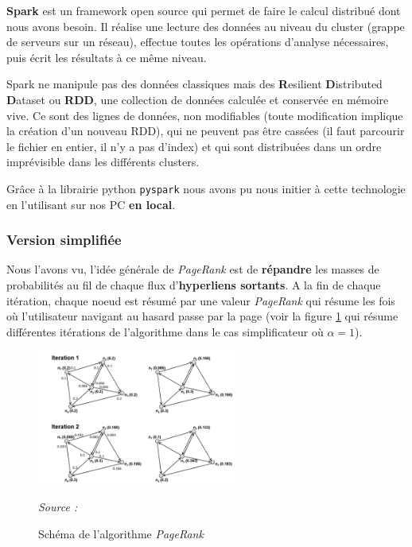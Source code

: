 \documentclass[10pt,a4paper]{article}
\theoremstyle{break}
\begin{document}
\textbf{Spark} est un framework open source qui permet de faire le calcul distribué dont nous avons besoin. Il réalise une lecture des données au niveau du cluster (grappe de serveurs sur un réseau), effectue toutes les opérations d'analyse nécessaires, puis écrit les résultats à ce même niveau.

Spark ne manipule pas des données classiques mais des \textbf{R}esilient \textbf{D}istributed \textbf{D}ataset ou \textbf{RDD}, une collection de données calculée et conservée en mémoire vive. Ce sont des lignes de données, non modifiables (toute modification implique la création d'un nouveau RDD), qui ne peuvent pas être cassées (il faut parcourir le fichier en entier, il n'y a pas d'index) et qui sont distribuées dans un ordre imprévisible dans les différents clusters.

Grâce à la librairie python \texttt{pyspark} nous avons pu nous initier à cette technologie en l'utilisant sur nos PC \textbf{en local}.

\hypertarget{version-simplifiuxe9e}{%
\subsubsection{Version simplifiée}\label{version-simplifiuxe9e}}

Nous l'avons vu, l'idée générale de \emph{PageRank} est de \textbf{répandre} les masses de probabilités au fil de chaque flux d'\textbf{hyperliens sortants}. A la fin de chaque itération, chaque noeud est résumé par une valeur \emph{PageRank} qui résume les fois où l'utilisateur navigant au hasard passe par la page (voir la figure \ref{fig:fig1} qui résume différentes itérations de l'algorithme dans le cas simplificateur où \(\alpha = 1\)).

\newpage

\begin{figure}[htp]
\begin{center}
\includegraphics[width=0.6\textwidth]{img/img1.png}
\captionsetup{margin=0cm,format=hang,justification=justified}
\caption{Schéma de l'algorithme \emph{PageRank}}\label{fig:fig1}
\emph{Source : \cite{Lin}}
\end{center}
\end{figure}
\end{document}
